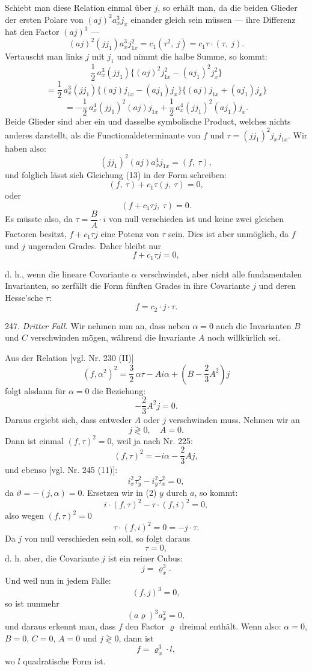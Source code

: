 \documentclass[11pt]{article}
\providecommand{\weberpage}[1]{}
\providecommand{\weq}[2]{\begin{equation}\tag{#1}#2\end{equation}}
\begin{document}
Schiebt man diese Relation einmal \"uber $j$, so erh\"alt man, da die beiden Glieder der ersten Polare von $(aj)^2 a_x^3 j_x$ einander gleich sein m\"ussen --- ihre Differenz hat den Factor $(aj)^3$ ---
\weq{13}{(aj)^2(jj_1)a_x^3 j_{1x}^2 = c_1(\tau^2,\ j) = c_1\tau\cdot(\tau,\ j).}
Vertauscht man links $j$ mit $j_1$ und nimmt die halbe Summe, so kommt:
\[
\frac{1}{2}\,a_x^3(jj_1)\{(aj)^2 j_{1x}^2 - (aj_1)^2 j_x^2\}
\]
\[
= \frac{1}{2}\,a_x^3(jj_1)\{(aj)j_{1x} - (aj_1)j_x\}\{(aj)j_{1x} + (aj_1)j_x\}
\]
\[
= -\frac{1}{2}\,a_x^4(jj_1)^2(aj)j_{1x} + \frac{1}{2}\,a_x^4(jj_1)^2(aj_1)j_x.
\]
Beide Glieder sind aber ein und dasselbe symbolische Product, welches nichts anderes darstellt, als die Functionaldeterminante von $f$ und $\tau=(jj_1)^2 j_x j_{1x}$. Wir haben also:
\[
(jj_1)^2(aj)a_x^4 j_{1x} = (f,\ \tau),
\]
und folglich l\"asst sich Gleichung (13) in der Form schreiben:
\[
(f,\ \tau) + c_1\tau(j,\ \tau) = 0,
\]
oder
\[
(f + c_1\tau j,\ \tau) = 0.
\]
Es m\"usste also, da $\tau = \dfrac{B}{A}\cdot i$ von null verschieden ist %
und keine zwei gleichen Factoren besitzt, $f+c_1\tau j$ eine Potenz von $\tau$ sein. Dies ist aber unm\"oglich, da $f$ und $j$ ungeraden Grades. Daher bleibt nur
\[
f + c_1\tau j = 0,
\]


\weberpage{273}
d. h., wenn die lineare Covariante $\alpha$ verschwindet, aber nicht alle
fundamentalen Invarianten, so zerfällt die Form fünften Grades in ihre
Covariante $j$ und deren Hesse'sche $\tau$:
\[
f = c_2 \cdot j \cdot \tau .
\]

247. \textit{Dritter Fall.} Wir nehmen nun an, dass neben $\alpha = 0$ auch
die Invarianten $B$ und $C$ verschwinden mögen, während die Invariante $A$
noch willkürlich sei.

Aus der Relation [vgl. Nr. 230 (II)]
\[
(f,\alpha^2)^2 = \frac{3}{2}\,\alpha\tau - Ai\alpha + \left(B - \frac{2}{3}A^2\right) j
\]
folgt alsdann für $\alpha = 0$ die Beziehung:
\[
-\frac{2}{3}A^2 j = 0.
\]
Daraus ergiebt sich, dass entweder $A$ oder $j$ verschwinden muss. Nehmen wir an
\weq{1}{j \gtrless 0,\quad A = 0.}
Dann ist einmal $(f,\tau)^2 = 0$, weil ja nach Nr. 225:
\weq{1}{(f,\tau)^2 = -i\alpha - \frac{2}{3}Aj,}
und ebenso [vgl. Nr. 245 (11)]:
\weq{2}{i_x^2\tau_y^2 - i_y^2\tau_x^2 = 0,}
da $\vartheta = -(j,\alpha) = 0$. Ersetzen wir in (2) $y$ durch $a$, so kommt:
\[
i\cdot(f,\tau)^2 - \tau\cdot(f,i)^2 = 0,
\]
also wegen $(f,\tau)^2 = 0$
\[
\tau\cdot(f,i)^2 = 0 = -j\cdot\tau .
\]
Da $j$ von null verschieden sein soll, so folgt daraus
\[
\tau = 0,
\]
d. h. aber, die Covariante $j$ ist ein reiner Cubus:
\[
j = \varrho_x^3 .
\]
Und weil nun in jedem Falle:
\[
(f,j)^3 = 0,
\]
so ist nunmehr
\[
(a\varrho)^3 a_x^2 = 0,
\]
und daraus erkennt man, dass $f$ den Factor $\varrho$ dreimal enthält. Wenn
also: $\alpha = 0$, $B = 0$, $C = 0$, $A = 0$ und $j \gtrless 0$, dann ist
\[
f = \varrho_x^3 \cdot l,
\]
wo $l$ quadratische Form ist.
\end{document}
